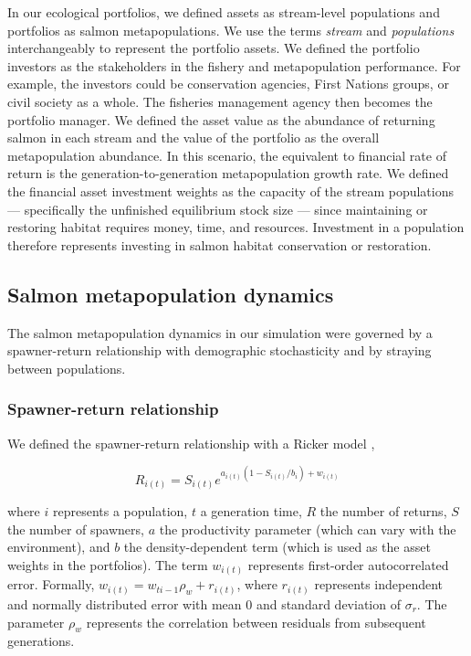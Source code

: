 In our ecological portfolios, we defined assets as stream-level populations and portfolios as salmon metapopulations. We use the terms \emph{stream} and \emph{populations} interchangeably to represent the portfolio assets. We defined the portfolio investors as the stakeholders in the fishery and metapopulation performance. For example, the investors could be conservation agencies, First Nations groups, or civil society as a whole. The fisheries management agency then becomes the portfolio manager. We defined the asset value as the abundance of returning salmon in each stream and the value of the portfolio as the overall metapopulation abundance. In this scenario, the equivalent to financial rate of return is the generation-to-generation metapopulation growth rate. We defined the financial asset investment weights as the capacity of the stream populations --- specifically the unfinished equilibrium stock size --- since maintaining or restoring habitat requires money, time, and resources. Investment in a population therefore represents investing in salmon habitat conservation or restoration.

\subsection{Salmon metapopulation dynamics}

The salmon metapopulation dynamics in our simulation were governed by a spawner-return relationship with demographic stochasticity and by straying between populations.

\subsubsection{Spawner-return relationship}

We defined the spawner-return relationship with a Ricker model \citep{ricker1954},

\[R_{i(t)} = S_{i(t)}e^{a_{i(t)}(1-S_{i(t)}/b_i) + w_{i(t)}}\]

\noindent where $i$ represents a population, $t$ a generation time, $R$ the number of returns, $S$ the number of spawners, $a$ the productivity parameter (which can vary with the environment), and $b$ the density-dependent term (which is used as the asset weights in the portfolios). The term $w_{i(t)}$ represents first-order autocorrelated error. Formally, $w_{i(t)} = w_{ti-1} \rho_w + r_{i(t)}$, where $r_{i(t)}$ represents independent and normally distributed error with mean 0 and standard deviation of $\sigma_r$. The parameter $\rho_w$ represents the correlation between residuals from subsequent generations.

